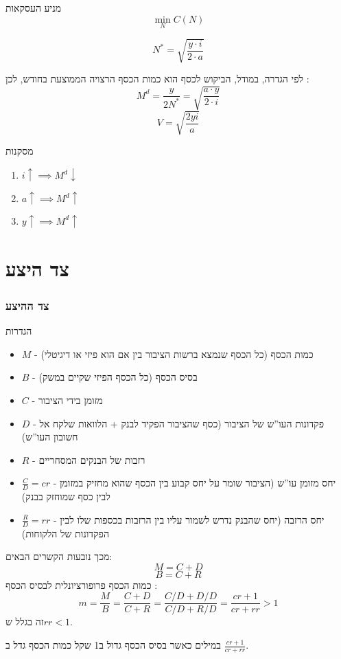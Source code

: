 \documentclass[usenames,dvipsnames]{beamer}
\begin{document}
\begin{RTL}
\begin{frame}[allowframebreaks]
\begin{block}{מניע העסקאות}
        $$\min_{N} C(N)$$

        $$N^* = \sqrt{\frac{y \cdot i}{2 \cdot a}}$$
    \end{block}
    לפי הגדרה, במודל, הביקוש לכסף הוא כמות הכסף הרצויה הממוצעת בחודש, לכן : 
    $$M^d = \frac{y}{2N^*} = \sqrt{\frac{a \cdot y}{2 \cdot i}} $$
    $$V = \sqrt{\frac{2yi}{a}}$$
    \begin{exampleblock}{מסקנות}
        \begin{enumerate}
            \item $i \uparrow \implies M^d \downarrow$
            \item $a \uparrow \implies M^d \uparrow$
            \item $y \uparrow \implies M^d  \uparrow$
        \end{enumerate}

        
    \end{exampleblock}

    

\end{frame}

\section{צד היצע}
\begin{frame}[allowframebreaks]
    \frametitle{צד ההיצע}
    \begin{block}{הגדרות}
        \begin{itemize}
            \item $M$ - כמות הכסף (כל הכסף שנמצא ברשות הציבור בין אם הוא פיזי או דיגיטלי)
            \item $B$ - בסיס הכסף (כל הכסף הפיזי שקיים במשק)
            \item $C$ - מזומן בידי הציבור
            \item $D$ - פקדונות העו''ש של הציבור (כסף שהציבור הפקיד לבנק + הלוואות שלקח אל חשובון העו''ש)
            \item $R$ - רזבות של הבנקים המסחריים
            \item $\frac{C}{D} = cr$ - יחס מזומן עו''ש (הציבור שומר על יחס קבוע בין הכסף שהוא מחזיק במזומן לבין כסף שמוחזק בבנק)
            \item $ \frac{R}{D} = rr$ - יחס הרזבה (יחס שהבנק נדרש לשמור עליו בין הרזבות בכספות שלו לבין הפקדונות של הלקוחות)
        \end{itemize}
    \end{block}
    מכך נובעות הקשרים הבאים:
    $$M = C + D$$
    $$B = C + R$$
    כמות הכסף פרופורציונלית לבסיס הכסף :
    $$m = \frac{M}{B} = \frac{C + D}{C + R} = \frac{C/D + D/D}{C/D + R/D} = \frac{cr + 1}{cr + rr} > 1$$
    זה בגלל ש$rr < 1$.
    \begin{block}{במילים}
        כאשר בסיס הכסף גדול ב1 שקל כמות הכסף גדל ב $\frac{cr + 1}{cr + rr}$.
    \end{block}


\end{frame}
\end{RTL}
\end{document}

